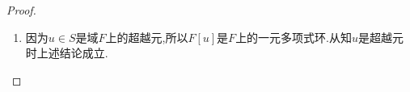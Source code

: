 \documentclass[../../main.tex]{subfiles}%
\begin{document}
\begin{proof}
\begin{enumerate}[(1)]
最后证明$p\left( x \right)$的唯一性。若还存在次数大于等于1的首一不可约多项式$p'\left( x \right) \in F\left[ x \right]$，使得
\begin{align*}
F\left[ u \right] \cong F\left[ x \right] /\langle p'\left( x \right) \rangle,\quad \langle p'\left( x \right) \rangle \cap F=\left\{ 0 \right\}.
\end{align*}
则
\begin{align*}
F\left[ x \right] /\langle p\left( x \right) \rangle \cong F\left[ u \right] \cong F\left[ x \right] /\langle p'\left( x \right) \rangle.
\end{align*}
从而由知$\langle p\left( x \right) \rangle =\langle p'\left( x \right) \rangle$，再由知$p\left( x \right) \sim p'\left( x \right)$。
而$p\left( x \right),p'\left( x \right)$都是首一不可约多项式，故$p'\left( x \right) =p\left( x \right)$或$1$。
若$p'\left( x \right) =1$，则与$\text{deg}p'(x)\geqslant 1$矛盾！因此$p'\left( x \right) =p\left( x \right).$

反之,若$p(x)$是不可约多项式,则由知$\langle p(x) \rangle$为素理想,再由知$p(x)$为$F[x]$中的素元素,于是由知$\langle p(x) \rangle$为极大理想.故由知$F[x]/\langle p(x) \rangle$是域,显然$F[x]/\langle p(x) \rangle\supseteq F$,故$F[x]/\langle p(x) \rangle$是$F$的扩域.

\item 因为$u \in S$是域$F$上的超越元,所以$F[u]$是$F$上的一元多项式环.从知$u$是超越元时上述结论成立.
\end{enumerate}
\end{proof}
\end{document}
